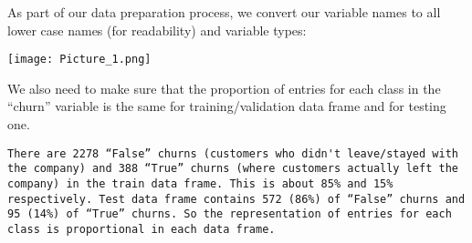 \newpage
As part of our data preparation process, we convert our variable names to all lower case names (for readability) and variable types: 

\texttt{[image: Picture\_1.png]}


We also need to make sure that the proportion of entries for each class in the “churn” variable is the same for training/validation data frame and for testing one. 

\begin{verbatim}
There are 2278 “False” churns (customers who didn't leave/stayed with the company) and 388 “True” churns (where customers actually left the company) in the train data frame. This is about 85% and 15% respectively. Test data frame contains 572 (86%) of “False” churns and 95 (14%) of “True” churns. So the representation of entries for each class is proportional in each data frame.
\end{verbatim}
